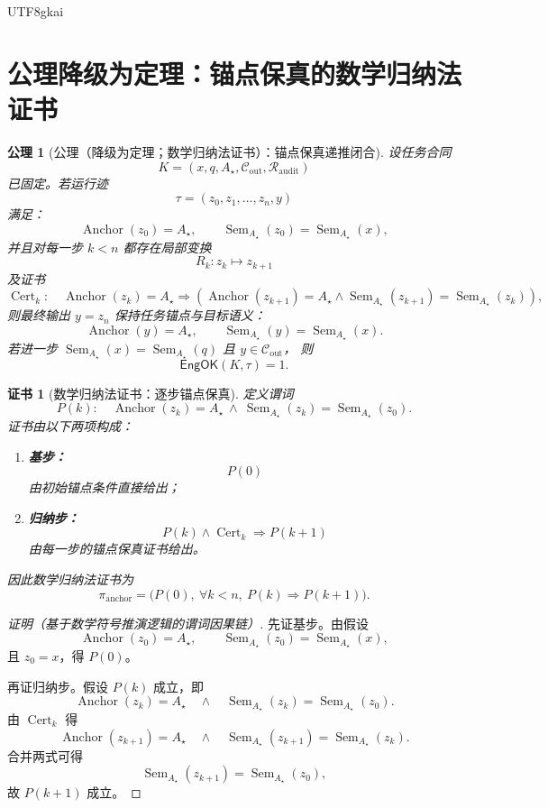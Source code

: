 \documentclass[12pt]{article}
\newtheorem{axiom}{公理}[section]
\newtheorem{Certificate}{证书}[section]
\newcommand{\EngOK}{\mathsf{EngOK}}
\newcommand{\Sem}{\operatorname{Sem}}
\newcommand{\Anchor}{\operatorname{Anchor}}
\newcommand{\Cert}{\operatorname{Cert}}
\begin{document}
\begin{CJK*}{UTF8}{gkai}
\clearpage

\section{公理降级为定理：锚点保真的数学归纳法证书}
\label{sec:tex51-anchor-induction}

\begin{axiom}[公理（降级为定理；数学归纳法证书）：锚点保真递推闭合]
\label{ax:tex51-anchor-preservation}
设任务合同
\[
  K=(x,q,A_\star,\mathcal C_{\mathrm{out}},\mathcal R_{\mathrm{audit}})
\]
已固定。若运行迹
\[
  \tau=(z_0,z_1,\dots,z_n,y)
\]
满足：
\[
  \Anchor(z_0)=A_\star,\qquad \Sem_{A_\star}(z_0)=\Sem_{A_\star}(x),
\]
并且对每一步 \(k<n\) 都存在局部变换
\[
  R_k:z_k\mapsto z_{k+1}
\]
及证书
\[
  \Cert_k:\quad
  \Anchor(z_k)=A_\star
  \Longrightarrow
  \left(
    \Anchor(z_{k+1})=A_\star
    \wedge
    \Sem_{A_\star}(z_{k+1})=\Sem_{A_\star}(z_k)
  \right),
\]
则最终输出 \(y=z_n\) 保持任务锚点与目标语义：
\[
  \Anchor(y)=A_\star,
  \qquad
  \Sem_{A_\star}(y)=\Sem_{A_\star}(x).
\]
若进一步 \(\Sem_{A_\star}(x)=\Sem_{A_\star}(q)\) 且 \(y\in\mathcal C_{\mathrm{out}}\)，
则
\[
  \EngOK(K,\tau)=1.
\]
\end{axiom}

\begin{Certificate}[数学归纳法证书：逐步锚点保真]
\label{cert:tex51-anchor-induction}
定义谓词
\[
  P(k):\quad
  \Anchor(z_k)=A_\star
  \ \wedge\
  \Sem_{A_\star}(z_k)=\Sem_{A_\star}(z_0).
\]
证书由以下两项构成：
\begin{enumerate}
  \item \textbf{基步：}
  \[
    P(0)
  \]
  由初始锚点条件直接给出；
  \item \textbf{归纳步：}
  \[
    P(k)\wedge\Cert_k\Longrightarrow P(k+1)
  \]
  由每一步的锚点保真证书给出。
\end{enumerate}
因此数学归纳法证书为
\[
  \pi_{\mathrm{anchor}}
  =
  \bigl(P(0),\ \forall k<n,\ P(k)\Rightarrow P(k+1)\bigr).
\]
\end{Certificate}

\begin{proof}[证明（基于数学符号推演逻辑的谓词因果链）]
先证基步。由假设
\[
  \Anchor(z_0)=A_\star,
  \qquad
  \Sem_{A_\star}(z_0)=\Sem_{A_\star}(x),
\]
且 \(z_0=x\)，得 \(P(0)\)。

再证归纳步。假设 \(P(k)\) 成立，即
\[
  \Anchor(z_k)=A_\star
  \quad\wedge\quad
  \Sem_{A_\star}(z_k)=\Sem_{A_\star}(z_0).
\]
由 \(\Cert_k\) 得
\[
  \Anchor(z_{k+1})=A_\star
  \quad\wedge\quad
  \Sem_{A_\star}(z_{k+1})=\Sem_{A_\star}(z_k).
\]
合并两式可得
\[
  \Sem_{A_\star}(z_{k+1})=\Sem_{A_\star}(z_0),
\]
故 \(P(k+1)\) 成立。


\end{proof}
\end{CJK*}
\end{document}
